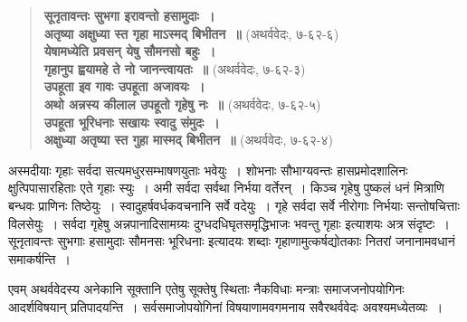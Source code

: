 \begin{verse}
\textbf{सूनृतावन्तः सुभगा इरावन्तो हसामुदाः~।}\\
\textbf{अतृष्या अक्षुध्या स्त गृहा माऽस्मद् बिभीतन~॥} (अथर्ववेदः, ७-६२-६)\\
\textbf{येषामध्येति प्रवसन् येषु सौमनसो बहुः~।}\\
\textbf{गृहानुप ह्वयामहे ते नो जानन्त्वायतः~॥} (अथर्ववेदः, ७-६२-३)\\
\textbf{उपहूता इव गावः उपहूता अजावयः~।}\\
\textbf{अथो अन्नस्य कीलाल उपहूतो गृहेषु नः~॥} (अथर्ववेदः, ७-६२-५)\\
\textbf{उपहूता भूरिधनाः सखायः स्वादु संमुदः~।}\\
\textbf{अक्षुध्या अतृष्या स्त गुहा मास्मद् बिभीतन~॥} (अथर्ववेदः, ७-६२-४)
\end{verse}

अस्मदीयाः गृहाः सर्वदा सत्यमधुरसम्भाषणयुताः भवेयुः~। शोभनाः सौभाग्यवन्तः हासप्रमोदशालिनः क्षुत्पिपासारहिताः एते गृहाः स्युः~। अमी सर्वदा सर्वथा निर्भया वर्तेरन्~। किञ्च गृहेषु पुष्कलं धनं मित्राणि बन्धवः प्राणिनः तिष्ठेयुः~। स्वादुहर्षवर्धकवचनानि सर्वे वदेयुः~। गृहे सर्वदा सर्वे नीरोगाः निर्भयाः सन्तोषचित्ताः विलसेयुः~। सर्वदा गृहेषु अन्नपानादिसामग्र्यः दुग्धदधिघृतसमृद्धिभाजः भवन्तु गृहाः इत्याशयः अत्र संदृष्टः~। सूनृतावन्तः सुभगाः हसामुदाः सौमनसः भूरिधनाः इत्यादयः शब्दाः गृहाणामुत्कर्षद्योतकाः नितरां जनानामवधानं समाकर्षन्ति~।

एवम् अथर्ववेदस्य अनेकानि सूक्तानि एतेषु सूक्तेषु स्थिताः नैकविधाः मन्त्राः समाजजनोपयोगिनः आदर्शविषयान् प्रतिपादयन्ति~। सर्वसमाजोपयोगिनां विषयाणामवगमनाय सवैरथर्ववेदः अवश्यमध्येतव्यः~।

\articleend
